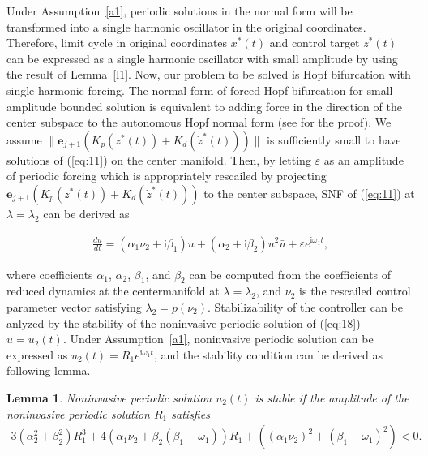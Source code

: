 \documentclass[openacc]{rsproca_new}%
\def\epsilon{\varepsilon}
\def\vec#1{\ensuremath{\mathbf{#1}}}
\newcommand{\Eref}[1]{(\ref{#1})}
\newcommand{\asref}[1]{Assumption~\ref{#1}}
\newcommand{\Lref}[1]{Lemma~\ref{#1}}
\newtheorem{lemma}{\bf Lemma}[section]
\begin{document}
\noindent  Under \asref{a1}, periodic solutions in the normal form will be transformed into a single harmonic oscillator in the original coordinates. Therefore, limit cycle in original coordinates $x^*(t)$ and control target  $z^*(t)$ can be expressed as a single harmonic oscillator with small amplitude by using the result of \Lref{l1}. Now, our problem to be solved is Hopf bifurcation with single harmonic forcing. The normal form of forced Hopf bifurcation for small amplitude bounded solution is equivalent to adding force in the direction of the center subspace to the autonomous Hopf normal form (see \cite{golubitsky2012feed,elphick1987normal} for the proof). We assume $\| \vec{e}_{j+1}(K_p(z^*(t))+K_d(\dot z^*(t)))\|$ is sufficiently small to have solutions of \Eref{eq:11} on the center manifold. Then, by letting $\epsilon$ as an amplitude of periodic forcing which is appropriately rescailed by projecting $\vec{e}_{j+1}(K_p(z^*(t))+K_d(\dot z^*(t)))$ to the center subspace, SNF of \Eref{eq:11} at $\lambda=\lambda_2$ can be derived as

\begin{align}\label{eq:18}
  \frac{du}{dt}=(\alpha_1 \nu_2+\textrm{i}\beta_1)u+(\alpha_2+\textrm{i}\beta_2)u^2\bar u+\epsilon e^{\textrm{i}\omega_1 t},
\end{align}

\noindent where coefficients $\alpha_1$, $\alpha_2$, $\beta_1$, and $\beta_2$ can be computed from the coefficients of reduced dynamics at the centermanifold at $\lambda=\lambda_2$, and $\nu_2$ is the rescailed control parameter vector satisfying $\lambda_2=p(\nu_2)$. Stabilizability of the controller can be anlyzed by the stability of the noninvasive periodic solution of \Eref{eq:18} $u=u_2(t)$. Under \asref{a1}, noninvasive periodic solution can be expressed as $u_2(t)=R_1e^{\textrm{i}\omega_1 t}$,  and the stability condition can be derived as following lemma.

\begin{lemma}\label{t1}
Noninvasive periodic solution $u_2(t)$ is stable if the amplitude of the noninvasive periodic solution $R_1$ satisfies
\begin{align}\label{eq:20}
3(\alpha_2^2+\beta_2^2)R_1^3+4(\alpha_1 \nu_2+\beta_2(\beta_1-\omega_1))R_1+((\alpha_1 \nu_2)^2+(\beta_1-\omega_1)^2)<0.
\end{align}
\end{lemma}
\end{document}
